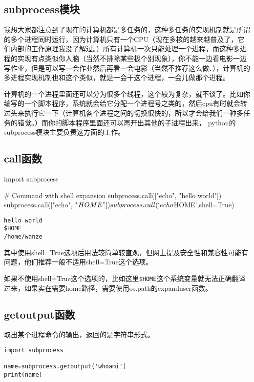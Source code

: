 \documentclass[12pt,oneside]{book}
\begin{document}
\begin{common-format}
\chapter{subprocess模块}
我想大家都注意到了现在的计算机都是多任务的，这种多任务的实现机制就是所谓的多个进程同时运行，因为计算机只有一个CPU（现在多核的越来越普及了，它们内部的工作原理我没了解过。）所有计算机一次只能处理一个进程，而这种多进程的实现有点类似你人脑（当然不排除某些极个别现象），你不能一边看电影一边写作业，但是可以写一会作业然后再看一会电影（当然不推荐这么做、），计算机的多进程实现机制也和这个类似，就是一会干这个进程，一会儿做那个进程。

计算机的一个进程里面还可以分为很多个线程，这个较为复杂，就不谈了。比如你编写的一个脚本程序，系统就会给它分配一个进程号之类的，然后cpu有时就会转过头来执行它一下（计算机各个进程之间的切换很快的，所以才会给我们一种多任务的错觉。）而你的脚本程序里面还可以再开出其他的子进程出来， python的subprocess模块主要负责这方面的工作。

\section{call函数}
\begin{tcbpython}[]
import subprocess

# Command with shell expansion
subprocess.call(["echo", "hello world"])
subprocess.call(["echo", "$HOME"])
subprocess.call('echo $HOME',shell=True)
\end{tcbpython}
\begin{Verbatim}
hello world
$HOME
/home/wanze
\end{Verbatim}

其中使用shell=True选项后用法较简单较直观，但网上提及安全性和兼容性可能有问题，他们推荐一般不适用shell=True这个选项。

如果不使用shell=True这个选项的，比如这里\verb+$HOME+这个系统变量就无法正确翻译过来，如果实在需要home路径，需要使用os.path的expanduser函数。



\section{getoutput函数}
取出某个进程命令的输出，返回的是字符串形式。
\begin{Verbatim}
import subprocess

name=subprocess.getoutput('whoami')
print(name)
\end{Verbatim}




\end{common-format}
\end{document}
